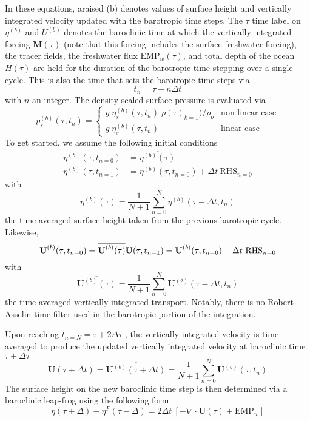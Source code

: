 \documentclass[../main/NEMO_manual]{subfiles}
\begin{document}
In these equations, araised (b) denotes values of surface height and
vertically integrated velocity updated with the barotropic time steps.
The $\tau$ time label on $\eta^{(b)}$ and $U^{(b)}$ denotes the baroclinic time at which
the vertically integrated forcing $\textbf{M}(\tau)$
(note that this forcing includes the surface freshwater forcing), the tracer fields,
the freshwater flux $\text{EMP}_w(\tau)$, and total depth of the ocean $H(\tau)$ are held for
the duration of the barotropic time stepping over a single cycle.
This is also the time that sets the barotropic time steps via 
\[
  t_n=\tau+n\Delta t   
\]
with $n$ an integer.
The density scaled surface pressure is evaluated via 
\[
  p_s^{(b)}(\tau,t_{n}) =
  \begin{cases}
    g \;\eta_s^{(b)}(\tau,t_{n}) \;\rho(\tau)_{k=1}) / \rho_o  &      \text{non-linear case} \\
    g \;\eta_s^{(b)}(\tau,t_{n})  &      \text{linear case}
  \end{cases}
\]
To get started, we assume the following initial conditions 
\[
  \begin{split}
    \eta^{(b)}(\tau,t_{n=0}) &= \overline{\eta^{(b)}(\tau)} \\
    \eta^{(b)}(\tau,t_{n=1}) &= \eta^{(b)}(\tau,t_{n=0}) + \Delta t \ \text{RHS}_{n=0}
  \end{split}
\]
with 
\[
  \overline{\eta^{(b)}(\tau)} = \frac{1}{N+1} \sum\limits_{n=0}^N \eta^{(b)}(\tau-\Delta t,t_{n})
\]
the time averaged surface height taken from the previous barotropic cycle.
Likewise,
\[
  \textbf{U}^{(b)}(\tau,t_{n=0}) = \overline{\textbf{U}^{(b)}(\tau)}	\\ \\
  \textbf{U}(\tau,t_{n=1}) = \textbf{U}^{(b)}(\tau,t_{n=0}) + \Delta t \ \text{RHS}_{n=0}
\]
with 
\[
  \overline{\textbf{U}^{(b)}(\tau)} = \frac{1}{N+1} \sum\limits_{n=0}^N\textbf{U}^{(b)}(\tau-\Delta t,t_{n})
\]
the time averaged vertically integrated transport.
Notably, there is no Robert-Asselin time filter used in the barotropic portion of the integration. 

Upon reaching $t_{n=N} = \tau + 2\Delta \tau$ , the vertically integrated velocity is time averaged to
produce the updated vertically integrated velocity at baroclinic time $\tau + \Delta \tau$ 
\[
  \textbf{U}(\tau+\Delta t) = \overline{\textbf{U}^{(b)}(\tau+\Delta t)}
  = \frac{1}{N+1} \sum\limits_{n=0}^N\textbf{U}^{(b)}(\tau,t_{n})
\]
The surface height on the new baroclinic time step is then determined via
a baroclinic leap-frog using the following form 
\begin{equation}
  \label{eq:DYN_spg_ts_ssh}
  \eta(\tau+\Delta) - \eta^{F}(\tau-\Delta) = 2\Delta t \ \left[ - \nabla \cdot \textbf{U}(\tau) + \text{EMP}_w \right]
\end{equation}
\end{document}

